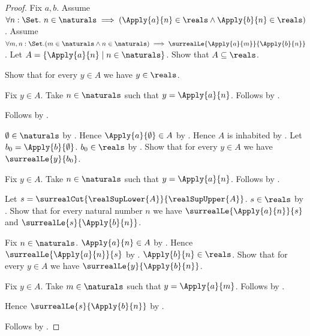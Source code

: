 \begin{proof}
    Fix $a,b$.
    Assume $\forall n:\Set.\ n\in\naturals\implies
        (\Apply{a}{n}\in\reals\land\Apply{b}{n}\in\reals)$.
    Assume $\forall m,n:\Set.
        (m\in\naturals\land n\in\naturals)
        \implies\surrealLe{\Apply{a}{m}}{\Apply{b}{n}}$.
    Let $A=\{\Apply{a}{n}\mid n\in\naturals\}$.
    Show that $A\subseteq\reals$.
    \begin{subproof}
        Show that for every $y\in A$ we have $y\in\reals$.
        \begin{subproof}
            Fix $y\in A$.
            Take $n\in\naturals$ such that
                $y=\Apply{a}{n}$.
            Follows by \auto.
        \end{subproof}
        Follows by .
    \end{subproof}
    $\emptyset\in\naturals$ by .
    Hence $\Apply{a}{\emptyset}\in A$
        by .
    Hence $A$ is inhabited by .
    Let $b_0=\Apply{b}{\emptyset}$.
    $b_0\in\reals$ by \auto.
    Show that for every $y\in A$ we have
        $\surrealLe{y}{b_0}$.
    \begin{subproof}
        Fix $y\in A$.
        Take $n\in\naturals$ such that
            $y=\Apply{a}{n}$.
        Follows by \auto.
    \end{subproof}
    Let $s=\surrealCut{\realSupLower{A}}{\realSupUpper{A}}$.
    $s\in\reals$ by .
    Show that for every natural number $n$ we have
        $\surrealLe{\Apply{a}{n}}{s}$ and
        $\surrealLe{s}{\Apply{b}{n}}$.
    \begin{subproof}
        Fix $n\in\naturals$.
        $\Apply{a}{n}\in A$ by .
        Hence $\surrealLe{\Apply{a}{n}}{s}$
            by .
        $\Apply{b}{n}\in\reals$.
        Show that for every $y\in A$ we have
            $\surrealLe{y}{\Apply{b}{n}}$.
        \begin{subproof}
            Fix $y\in A$.
            Take $m\in\naturals$ such that
                $y=\Apply{a}{m}$.
            Follows by \auto.
        \end{subproof}
        Hence $\surrealLe{s}{\Apply{b}{n}}$
            by .
    \end{subproof}
    Follows by \auto.
\end{proof}

